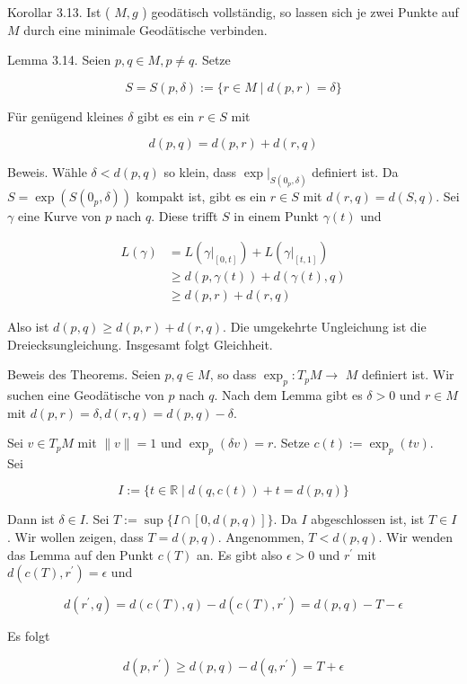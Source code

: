 \documentclass[10pt]{article}
\begin{document}
Korollar 3.13. Ist ( $M, g$ ) geodätisch vollständig, so lassen sich je zwei Punkte auf $M$ durch eine minimale Geodätische verbinden.

Lemma 3.14. Seien $p, q \in M, p \neq q$. Setze

$$
S=S(p, \delta):=\{r \in M \mid d(p, r)=\delta\}
$$

Für genügend kleines $\delta$ gibt es ein $r \in S$ mit

$$
d(p, q)=d(p, r)+d(r, q)
$$

Beweis. Wähle $\delta<d(p, q)$ so klein, dass $\left.\exp \right|_{S\left(0_{p}, \delta\right)}$ definiert ist. Da $S=\exp \left(S\left(0_{p}, \delta\right)\right)$ kompakt ist, gibt es ein $r \in S$ mit $d(r, q)=d(S, q)$. Sei $\gamma$ eine Kurve von $p$ nach $q$. Diese trifft $S$ in einem Punkt $\gamma(t)$ und

$$
\begin{aligned}
L(\gamma) & =L\left(\left.\gamma\right|_{[0, t]}\right)+L\left(\left.\gamma\right|_{[t, 1]}\right) \\
& \geq d(p, \gamma(t))+d(\gamma(t), q) \\
& \geq d(p, r)+d(r, q)
\end{aligned}
$$

Also ist $d(p, q) \geq d(p, r)+d(r, q)$. Die umgekehrte Ungleichung ist die Dreiecksungleichung. Insgesamt folgt Gleichheit.

Beweis des Theorems. Seien $p, q \in M$, so dass $\exp _{p}: T_{p} M \rightarrow$ $M$ definiert ist. Wir suchen eine Geodätische von $p$ nach $q$. Nach dem Lemma gibt es $\delta>0$ und $r \in M$ mit $d(p, r)=\delta, d(r, q)=d(p, q)-\delta$.

Sei $v \in T_{p} M$ mit $\|v\|=1$ und $\exp _{p}(\delta v)=r$. Setze $c(t):=\exp _{p}(t v)$.\\
Sei

$$
I:=\{t \in \mathbb{R} \mid d(q, c(t))+t=d(p, q)\}
$$

Dann ist $\delta \in I$. Sei $T:=\sup \{I \cap[0, d(p, q)]\}$. Da $I$ abgeschlossen ist, ist $T \in I$. Wir wollen zeigen, dass $T=d(p, q)$. Angenommen, $T<d(p, q)$. Wir wenden das Lemma auf den Punkt $c(T)$ an. Es gibt also $\epsilon>0$ und $r^{\prime}$ mit $d\left(c(T), r^{\prime}\right)=\epsilon$ und

$$
d\left(r^{\prime}, q\right)=d(c(T), q)-d\left(c(T), r^{\prime}\right)=d(p, q)-T-\epsilon
$$

Es folgt

$$
d\left(p, r^{\prime}\right) \geq d(p, q)-d\left(q, r^{\prime}\right)=T+\epsilon
$$
\end{document}
